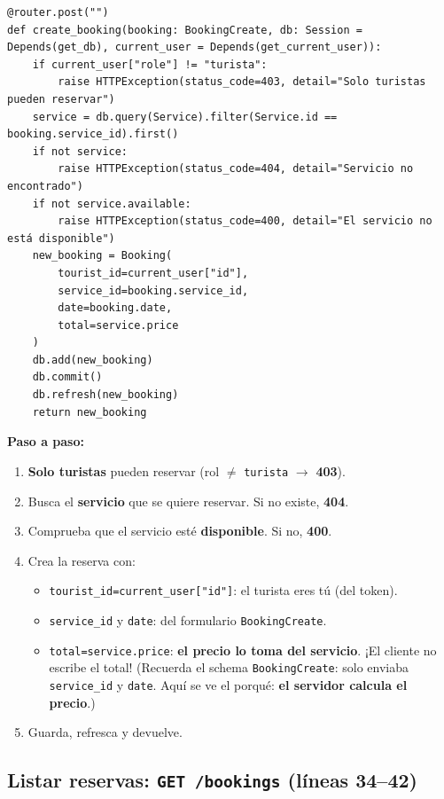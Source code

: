 \documentclass[11pt,a4paper]{article}
\begin{document}
\begin{lstlisting}
@router.post("")
def create_booking(booking: BookingCreate, db: Session = Depends(get_db), current_user = Depends(get_current_user)):
    if current_user["role"] != "turista":
        raise HTTPException(status_code=403, detail="Solo turistas pueden reservar")
    service = db.query(Service).filter(Service.id == booking.service_id).first()
    if not service:
        raise HTTPException(status_code=404, detail="Servicio no encontrado")
    if not service.available:
        raise HTTPException(status_code=400, detail="El servicio no está disponible")
    new_booking = Booking(
        tourist_id=current_user["id"],
        service_id=booking.service_id,
        date=booking.date,
        total=service.price
    )
    db.add(new_booking)
    db.commit()
    db.refresh(new_booking)
    return new_booking
\end{lstlisting}

\textbf{Paso a paso:}
\begin{enumerate}
    \item \textbf{Solo turistas} pueden reservar (rol $\neq$ \texttt{turista} $\rightarrow$ \textbf{403}).
    \item Busca el \textbf{servicio} que se quiere reservar. Si no existe, \textbf{404}.
    \item Comprueba que el servicio esté \textbf{disponible}. Si no, \textbf{400}.
    \item Crea la reserva con:
    \begin{itemize}
        \item \texttt{tourist\_id=current\_user["id"]}: el turista eres tú (del token).
        \item \texttt{service\_id} y \texttt{date}: del formulario \texttt{BookingCreate}.
        \item \texttt{total=service.price}: \textbf{el precio lo toma del servicio}. ¡El cliente
        no escribe el total! (Recuerda el schema \texttt{BookingCreate}: solo enviaba
        \texttt{service\_id} y \texttt{date}. Aquí se ve el porqué: \textbf{el servidor calcula el precio}.)
    \end{itemize}
    \item Guarda, refresca y devuelve.
\end{enumerate}

\subsection{Listar reservas: \texttt{GET /bookings} (líneas 34--42)}
\end{document}
